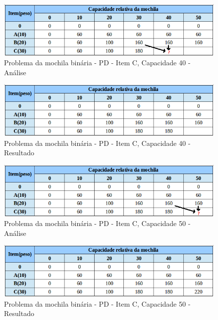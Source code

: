 \FloatBarrier
\begin{figure}[!h]
\centering
\includegraphics[keepaspectratio=true,scale=0.6]{figuras/mochila30_40.png}
\caption{Problema da mochila binária - PD - Item C, Capacidade 40 - Análise}
\label{mochila30_40}
\end{figure}

\FloatBarrier
\begin{figure}[!h]
\centering
\includegraphics[keepaspectratio=true,scale=0.6]{figuras/mochila30_40_resp.png}
\caption{Problema da mochila binária - PD - Item C, Capacidade 40 - Resultado}
\label{mochila30_40_resp}
\end{figure}

\FloatBarrier
\begin{figure}[!h]
\centering
\includegraphics[keepaspectratio=true,scale=0.6]{figuras/mochila30_50.png}
\caption{Problema da mochila binária - PD - Item C, Capacidade 50 - Análise}
\label{mochila30_50}
\end{figure}

\FloatBarrier
\begin{figure}[!h]
\centering
\includegraphics[keepaspectratio=true,scale=0.5]{figuras/mochilaResultado.png}
\caption{Problema da mochila binária - PD - Item C, Capacidade 50 - Resultado}
\label{mochila30_50_resp}
\end{figure}


